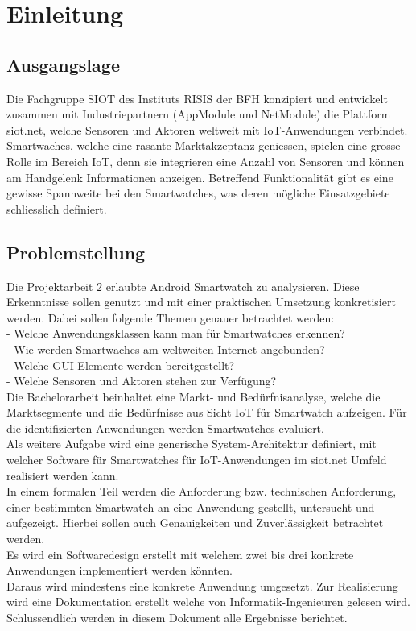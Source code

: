 \chapter{Einleitung}
\section{Ausgangslage}
Die Fachgruppe SIOT des Instituts RISIS der BFH konzipiert und entwickelt zusammen mit Industriepartnern (AppModule und NetModule) die Plattform siot.net, welche Sensoren und Aktoren weltweit mit \gls{IoT}-Anwendungen verbindet. Smartwaches, welche eine rasante Marktakzeptanz geniessen, spielen eine grosse Rolle im Bereich \gls{IoT}, denn sie integrieren eine Anzahl von Sensoren und können am Handgelenk Informationen anzeigen. Betreffend Funktionalität gibt es eine gewisse Spannweite bei den Smartwatches, was deren mögliche Einsatzgebiete schliesslich definiert.

\section{Problemstellung}
Die Projektarbeit 2 erlaubte Android Smartwatch zu analysieren. Diese Erkenntnisse sollen genutzt und mit einer praktischen Umsetzung konkretisiert werden.
Dabei sollen folgende Themen genauer betrachtet werden: \\
- Welche Anwendungsklassen kann man für Smartwatches erkennen? \\
- Wie werden Smartwaches am weltweiten Internet angebunden? \\
- Welche GUI-Elemente werden bereitgestellt? \\
- Welche Sensoren und Aktoren stehen zur Verfügung? \\

Die Bachelorarbeit beinhaltet eine Markt- und Bedürfnisanalyse, welche die Marktsegmente und die Bedürfnisse aus Sicht \gls{IoT} für Smartwatch aufzeigen. Für die identifizierten Anwendungen werden Smartwatches evaluiert.\\
Als weitere Aufgabe wird eine generische System-Architektur definiert, mit welcher Software für Smartwatches für \gls{IoT}-Anwendungen im siot.net Umfeld realisiert werden kann. \\
In einem formalen Teil werden die Anforderung bzw. technischen Anforderung, einer bestimmten Smartwatch an eine Anwendung gestellt, untersucht und aufgezeigt. Hierbei sollen auch Genauigkeiten und Zuverlässigkeit betrachtet werden. \\
Es wird ein Softwaredesign erstellt mit welchem zwei bis drei konkrete Anwendungen implementiert werden könnten. \\
Daraus wird mindestens eine konkrete Anwendung umgesetzt. Zur Realisierung wird eine Dokumentation erstellt welche von Informatik-Ingenieuren gelesen wird. \\
Schlussendlich werden in diesem Dokument alle Ergebnisse berichtet.

